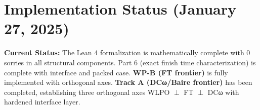 \documentclass[11pt]{article}
\theoremstyle{definition}
\theoremstyle{remark}
\begin{document}
\section{Implementation Status (January 27, 2025)}

\begin{mdframed}[style=status]
\textbf{Current Status:} The Lean 4 formalization is mathematically complete with 0 sorries in all structural components. Part 6 (exact finish time characterization) is complete with interface and packed case. \textbf{WP-B (FT frontier)} is fully implemented with orthogonal axes. \textbf{Track A (DCω/Baire frontier)} has been completed, establishing three orthogonal axes WLPO $\perp$ FT $\perp$ DCω with hardened interface layer.
\end{mdframed}
\end{document}
